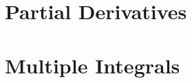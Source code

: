 \documentclass{article}
\begin{document}
\section{Partial Derivatives}


\newpage
\section{Multiple Integrals}





\end{document}
